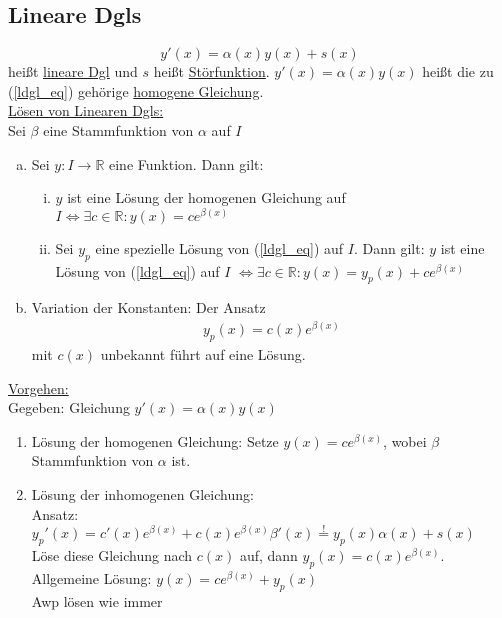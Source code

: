 \subsection{Lineare Dgls}
\begin{equation} \label{ldgl_eq}
    y'(x) = \alpha(x) y(x) + s(x) 
\end{equation}
heißt \underline{lineare Dgl} und $s$ heißt \underline{Störfunktion}. $y'(x)=\alpha(x)y(x)$ heißt die zu (\ref{ldgl_eq}) gehörige \underline{homogene Gleichung}. \\
\underline{Lösen von Linearen Dgls:} \\
Sei $\beta$ eine Stammfunktion von $\alpha$ auf $I$
\begin{enumerate} [a)]
    \item Sei $y: I \to \mathbb{R}$ eine Funktion. Dann gilt:
    \begin{enumerate} [i)]
        \item $y$ ist eine Lösung der homogenen Gleichung auf $I \Leftrightarrow \exists c \in \mathbb{R}: y(x) = ce^{\beta(x)}$
        \item Sei $y_p$ eine spezielle Lösung von (\ref{ldgl_eq}) auf $I$. Dann gilt: $y$ ist eine Lösung von (\ref{ldgl_eq}) auf $I$
        $\Leftrightarrow \exists c \in \mathbb{R}: y(x) = y_p(x) + ce^{\beta(x)}$
    \end{enumerate}
    \item Variation der Konstanten: Der Ansatz 
    \begin{align*}
        y_p(x) = c(x)e^{\beta(x)}
    \end{align*}
    mit $c(x)$ unbekannt führt auf eine Lösung.
\end{enumerate}
\underline{Vorgehen:} \\
Gegeben: Gleichung $y'(x) = \alpha(x)y(x)$
\begin{enumerate}
    \item Lösung der homogenen Gleichung: Setze $y(x) = ce^{\beta(x)}$, wobei $\beta$ Stammfunktion von $\alpha$ ist.
    \item Lösung der inhomogenen Gleichung: \\
    Ansatz: $y_p'(x) = c'(x)e^{\beta(x)} + c(x) e^{\beta(x)}\beta'(x) \stackrel{\text{!}}{=} y_p(x)\alpha(x) + s(x)$ \\
    Löse diese Gleichung nach $c(x)$ auf, dann $y_p(x) = c(x)e^{\beta(x)}$. Allgemeine Lösung: $y(x)=ce^{\beta(x)} + y_p(x)$ \\
    Awp lösen wie immer
\end{enumerate}

